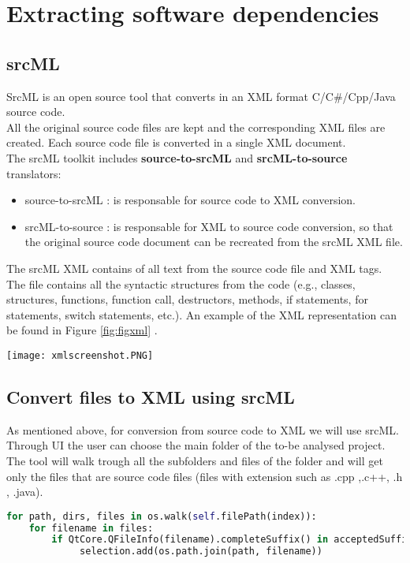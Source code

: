 \section{Extracting software dependencies}
\subsection{srcML}
SrcML is an open source tool that converts in an XML format C/C\#/Cpp/Java source code. \cite{srcml1}\\
All the original source code files are kept and the corresponding XML files are created. Each source code file is converted in a single XML document.\\
 The srcML toolkit includes \textbf{source-to-srcML} and \textbf{srcML-to-source} translators:
\begin{itemize}
  \item source-to-srcML : is responsable for source code to XML conversion.
  \item srcML-to-source : is responsable for XML to source code conversion, so that the original source code document can be recreated from the srcML XML file.
\end{itemize}

The srcML XML contains of all text from the source code file and XML tags. The file contains all the syntactic structures from the code (e.g., classes, structures, functions, function call, destructors, methods, if statements, for statements, switch statements, etc.).\cite{srcml2}
An example of the XML representation can be found in Figure \ref{fig:figxml} .

\begin{figure*}[h]
\centering
\texttt{[image: xmlscreenshot.PNG]}
\caption{Example of XML representation of source code.}
\label{fig:figxml}
\end{figure*}

\subsection{Convert files to XML using srcML}
\tab As mentioned above, for conversion from source code to XML we will use srcML.
Through UI the user can choose the main folder of the to-be analysed project. The tool will walk trough all the subfolders and files of the folder and will get only the files that are source code files (files with extension such as .cpp ,.c++, .h , .java).
\begin{lstlisting}[language=python, caption={Walk through the given directory and extract only source code files}]
for path, dirs, files in os.walk(self.filePath(index)):
    for filename in files:
        if QtCore.QFileInfo(filename).completeSuffix() in acceptedSuffix:
             selection.add(os.path.join(path, filename))
\end{lstlisting}

